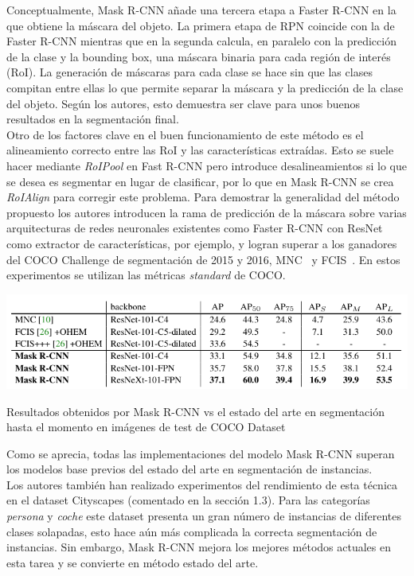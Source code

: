 \documentclass{bmvc2k}
\begin{document}
Conceptualmente, Mask R-CNN añade una tercera etapa a Faster R-CNN en la que obtiene la máscara del objeto. La primera etapa de RPN coincide con la de Faster R-CNN mientras que en la segunda calcula, en paralelo con la predicción de la clase y la bounding box, una máscara binaria para cada región de interés (RoI). La generación de máscaras para cada clase se hace sin que las clases compitan entre ellas lo que permite separar la máscara y la predicción de la clase del objeto. Según los autores, esto demuestra ser clave para unos buenos resultados en la segmentación final.\\ 
Otro de los factores clave en el buen funcionamiento de este método es el alineamiento correcto entre las RoI y las características extraídas. Esto se suele hacer mediante \textit{RoIPool} en Fast R-CNN pero introduce desalineamientos si lo que se desea es segmentar en lugar de clasificar, por lo que en Mask R-CNN se crea \textit{RoIAlign} para corregir este problema. Para demostrar la generalidad del método propuesto los autores introducen la rama de predicción de la máscara sobre varias arquitecturas de redes neuronales existentes como Faster R-CNN con ResNet como extractor de características, por ejemplo, y logran superar a los ganadores del COCO Challenge de segmentación de 2015 y 2016, MNC~\cite{dai2016instance} y FCIS~\cite{li2016fully}. En estos experimentos se utilizan las métricas \textit{standard} de COCO.
\begin{table}[h!]
\begin{center}
\includegraphics[scale=0.40]{mask_vs_mnc_fcis.png}
\caption{Resultados obtenidos por Mask R-CNN vs el estado del arte en segmentación hasta el momento en imágenes de test de COCO Dataset}
\end{center}
\end{table}
Como se aprecia, todas las implementaciones del modelo Mask R-CNN superan los modelos base previos del estado del arte en segmentación de instancias.\\
Los autores también han realizado experimentos del rendimiento de esta técnica en el dataset Cityscapes (comentado en la sección 1.3). Para las categorías \textit{persona} y \textit{coche} este dataset presenta un gran número de instancias de diferentes clases solapadas, esto hace aún más complicada la correcta segmentación de instancias. Sin embargo, Mask R-CNN mejora los mejores métodos actuales en esta tarea y se convierte en método estado del arte.
{}
\end{document}
